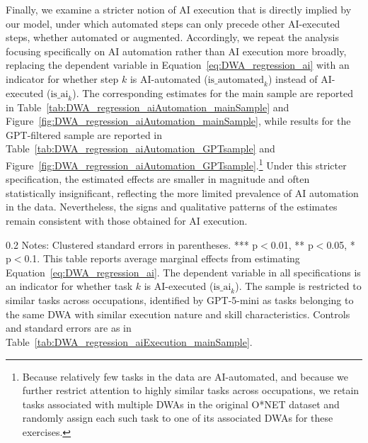 Finally, we examine a stricter notion of AI execution that is directly implied by our model, under which automated steps can only precede other AI-executed steps, whether automated or augmented.
Accordingly, we repeat the analysis focusing specifically on AI automation rather than AI execution more broadly, replacing the dependent variable in Equation~\eqref{eq:DWA_regression_ai} with an indicator for whether step $k$ is AI-automated ($\text{is\_automated}_{k}$) instead of AI-executed ($\text{is\_ai}_{k}$).
The corresponding estimates for the main sample are reported in Table~\ref{tab:DWA_regression_aiAutomation_mainSample} and Figure~\ref{fig:DWA_regression_aiAutomation_mainSample}, while results for the GPT-filtered sample are reported in Table~\ref{tab:DWA_regression_aiAutomation_GPTsample} and Figure~\ref{fig:DWA_regression_aiAutomation_GPTsample}.\footnote{
Because relatively few tasks in the data are AI-automated, and because we further restrict attention to highly similar tasks across occupations, we retain tasks associated with multiple DWAs in the original O*NET dataset and randomly assign each such task to one of its associated DWAs for these exercises.
}
Under this stricter specification, the estimated effects are smaller in magnitude and often statistically insignificant, reflecting the more limited prevalence of AI automation in the data. Nevertheless, the signs and qualitative patterns of the estimates remain consistent with those obtained for AI execution.


\begin{table}[!t]
\centering
\caption{Effect of Neighboring Tasks' AI Execution Status on Task's AI Execution Likelihood (GPT-filtered Sample)}
\label{tab:DWA_regression_aiExecution_GPTsample}
    \footnotesize
\resizebox{\textwidth}{!}{

}
\begin{minipage}{1\linewidth}
\begin{spacing}{0.2}
{\fontsize{9.5pt}{10pt}\selectfont Notes: Clustered standard errors in parentheses. *** p$<$0.01, ** p$<$0.05, * p$<$0.1.
This table reports average marginal effects from estimating Equation~\eqref{eq:DWA_regression_ai}.
The dependent variable in all specifications is an indicator for whether task $k$ is AI-executed ($\text{is\_ai}_{k}$).
The sample is restricted to similar tasks across occupations, identified by GPT-5-mini as tasks belonging to the same DWA with similar execution nature and skill characteristics.
Controls and standard errors are as in Table~\ref{tab:DWA_regression_aiExecution_mainSample}.}
\end{spacing}
\end{minipage}\end{table}

